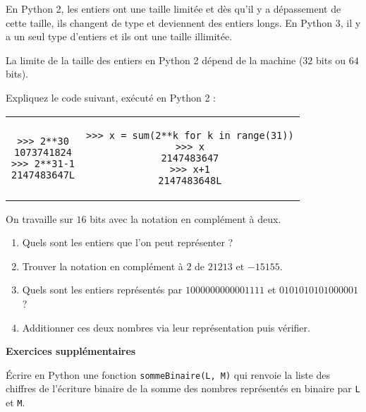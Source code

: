 En Python 2, les entiers ont une taille limitée et dès qu'il y a dépassement de cette taille, ils changent de type et deviennent des entiers longs. En Python 3, il y a un seul type d'entiers et ils ont une taille illimitée.

\smallskip

La limite de la taille des entiers en Python 2 dépend de la machine ($32$ bits ou $64$ bits).


\exercice{}
Expliquez le code suivant, exécuté en Python 2 :

\medskip


\begin{center}
\begin{tabular}{cc}
\begin{minipage}{6cm}
\begin{lstlisting}
>>> 2**30
1073741824
>>> 2**31-1
2147483647L
\end{lstlisting}
\end{minipage}
&
\begin{minipage}{11cm}
\begin{lstlisting}
>>> x = sum(2**k for k in range(31))
>>> x
2147483647
>>> x+1
2147483648L
\end{lstlisting}
\end{minipage}
\end{tabular}
\end{center}



\entrainement{}
On travaille sur $16$ bits avec la notation en complément à deux.
\begin{enumerate}
\item Quels sont les entiers que l'on peut représenter ?
\item Trouver la notation en complément à $2$ de $21213$ et $-15155$.
\item Quels sont les entiers représentés par $1000000000001111$ et $0101010101000001$ ?
\item Additionner ces deux nombres via leur représentation puis vérifier.
\end{enumerate}
\vskip 2cm

\begin{center}
	{\bf\large  Exercices supplémentaires}

\end{center}
\exercice{}

\'Ecrire en Python une fonction \verb+sommeBinaire(L, M)+ qui renvoie la liste des chiffres de l'écriture binaire de la somme des nombres représentés en binaire par \verb+L+ et \verb+M+. 



